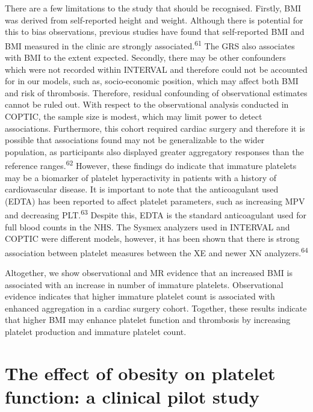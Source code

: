 \documentclass[11pt,twoside]{bristolthesis}
\begin{document}
There are a few limitations to the study that should be recognised. Firstly, BMI was derived from self-reported height and weight. Although there is potential for this to bias observations, previous studies have found that self-reported BMI and BMI measured in the clinic are strongly associated.\textsuperscript{61} The GRS also associates with BMI to the extent expected. Secondly, there may be other confounders which were not recorded within INTERVAL and therefore could not be accounted for in our models, such as, socio-economic position, which may affect both BMI and risk of thrombosis. Therefore, residual confounding of observational estimates cannot be ruled out. With respect to the observational analysis conducted in COPTIC, the sample size is modest, which may limit power to detect associations. Furthermore, this cohort required cardiac surgery and therefore it is possible that associations found may not be generalizable to the wider population, as participants also displayed greater aggregatory responses than the reference ranges.\textsuperscript{62} However, these findings do indicate that immature platelets may be a biomarker of platelet hyperactivity in patients with a history of cardiovascular disease. It is important to note that the anticoagulant used (EDTA) has been reported to affect platelet parameters, such as increasing MPV and decreasing PLT.\textsuperscript{63} Despite this, EDTA is the standard anticoagulant used for full blood counts in the NHS. The Sysmex analyzers used in INTERVAL and COPTIC were different models, however, it has been shown that there is strong association between platelet measures between the XE and newer XN analyzers.\textsuperscript{64}

Altogether, we show observational and MR evidence that an increased BMI is associated with an increase in number of immature platelets. Observational evidence indicates that higher immature platelet count is associated with enhanced aggregation in a cardiac surgery cohort. Together, these results indicate that higher BMI may enhance platelet function and thrombosis by increasing platelet production and immature platelet count.

\hypertarget{the-effect-of-obesity-on-platelet-function-a-clinical-pilot-study}{%
\chapter{The effect of obesity on platelet function: a clinical pilot study}\label{the-effect-of-obesity-on-platelet-function-a-clinical-pilot-study}}
\end{document}
